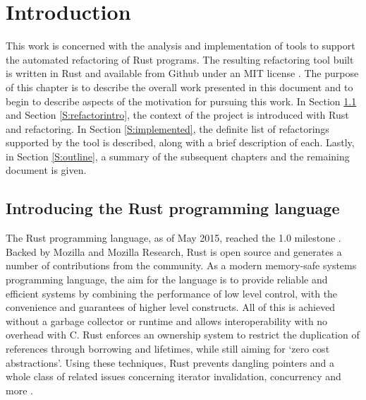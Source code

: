 \chapter{Introduction}\label{C:intro}
This work is concerned with the analysis and implementation of tools to support the automated refactoring of Rust programs. The resulting refactoring tool built is written in Rust and available from Github under an MIT license \cite{rrproject}. The purpose of this chapter is to describe the overall work presented in this document and to begin to describe aspects of the motivation for pursuing this work. In Section \ref{S:rustintro} and Section \ref{S:refactorintro}, the context of the project is introduced with Rust and refactoring. In Section \ref{S:implemented}, the definite list of refactorings supported by the tool is described, along with a brief description of each. Lastly, in Section \ref{S:outline}, a summary of the subsequent chapters and the remaining document is given.


\section{Introducing the Rust programming language}\label{S:rustintro}


The Rust programming language, as of May 2015, reached the 1.0 milestone \cite{rustcore15}. Backed by Mozilla and Mozilla Research, Rust is open source and generates a number of contributions from the community. As a modern memory-safe systems programming language, the aim for the language is to provide reliable and efficient systems by combining the performance of low level control, with the convenience and guarantees of higher level constructs. All of this is achieved without a garbage collector or runtime and allows interoperability with no overhead with C. Rust enforces an ownership system to restrict the duplication of references through borrowing and lifetimes, while still aiming for `zero cost abstractions'. Using these techniques, Rust prevents dangling pointers and a whole class of related issues concerning iterator invalidation, concurrency and more \cite{rustbook15}.

